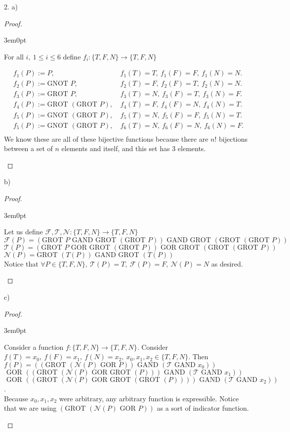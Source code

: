 \documentclass[11pt]{article}
\newcommand{\gor}{\mbox{ GOR }}
\newcommand{\gand}{\mbox{ GAND }}
\newcommand{\gnot}{\mbox{GNOT }}
\newcommand{\grot}{\mbox{GROT }}
\newenvironment{myproof}
{\begin{proof} \begin{adjustwidth}{3em}{0pt}$ $\par\nobreak\ignorespaces}
{\end{adjustwidth} \end{proof}}
\begin{document}
\begin{flushleft}
\newpage

2. a)

\begin{myproof}
For all $i, \ 1 \leq i \leq 6$ define $f_i: \{ T, F, N \} \to \{ T, F, N \}$

\begin{align*}
f_1(P) := P, \ & f_1(T) = T, \ f_1(F) = F, \ f_1(N) = N. \\
f_2(P) := \gnot P, \ & f_2(T) = F, \ f_2(F) = T, \ f_2(N) = N. \\
f_3(P) := \grot P, \ & f_3(T) = N, \ f_3(F) = T, \ f_3(N) = F. \\
f_4(P) := \grot (\grot P), \ & f_4(T) = F, \ f_4(F) = N, \ f_4(N) = T. \\
f_5(P) := \gnot (\grot P), \ & f_5(T) = N, \ f_5(F) = F, \ f_5(N) = T. \\
f_5(P) := \gnot (\grot P), \ & f_6(T) = N, \ f_6(F) = N, \ f_6(N) = F. \\
\end{align*}
We know these are all of these bijective functions because there are $n!$ bijections between a set of $n$ elements and itself, and this set has 3 elements.

\end{myproof}

b)

\begin{myproof}

Let us define $\mathcal{F},\mathcal{T},\mathcal{N}: \{T,F,N\} \to \{T,F,N\}$ \\ $\mathcal{F}(P) = (\grot P \gand \grot (\grot P)) \gand \grot (\grot (\grot P))$ \\ $\mathcal{T}(P) = (\grot P \gor \grot (\grot P)) \gor \grot (\grot (\grot P))$ \\ 
$\mathcal{N}(P) = \grot (T(P)) \gand \grot (T(P))$ \\
\bigskip
Notice that $\forall P \in \{ T, F, N \}, \ \mathcal{T}(P) = T, \ \mathcal{F}(P) = F, \ \mathcal{N}(P) = N$ as desired.

\end{myproof}

c)

\begin{myproof}

Consider a function $f:\{T,F,N\} \to \{T,F,N\}$. Consider $f(T) = x_0, \ f(F) = x_1, \ f(N) = x_2, \ x_0,x_1,x_2 \in \{ T, F, N \}$. Then $f(P) = (( \grot (\mathcal{N}(P) \gor P)) \gand (\mathcal{T} \gand x_0))$\\ $\gor (( \grot (\mathcal{N}(P) \gor \grot (P))) \gand (\mathcal{T} \gand x_1))$ \\ $ \gor (( \grot (\mathcal{N}(P) \gor \grot (\grot(P)))) \gand (\mathcal{T} \gand x_2))$. \\
\bigskip
Because $x_0,x_1,x_2$ were arbitrary, any arbitrary function is expressible. Notice that we are using $( \grot (\mathcal{N}(P) \gor P))$ as a sort of indicator function.


\end{myproof}
\end{flushleft}
\end{document}
